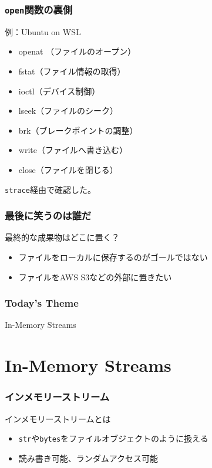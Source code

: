 \documentclass[dvipdfmx,12pt,notheorems]{beamer}
\theoremstyle{definition}
\begin{document}
\begin{frame}[fragile]\frametitle{\texttt{open}関数の裏側}

\begin{exampleblock}{例：Ubuntu on WSL}
\begin{itemize}
\item openat （ファイルのオープン）
\item fstat（ファイル情報の取得）
\item ioctl（デバイス制御）
\item lseek（ファイルのシーク）
\item brk（ブレークポイントの調整）
\item write（ファイルへ書き込む）
\item close（ファイルを閉じる）
\end{itemize}
\end{exampleblock}
\texttt{strace}経由で確認した。

\end{frame}

\begin{frame}\frametitle{最後に笑うのは誰だ}
\begin{block}{最終的な成果物はどこに置く？}
\begin{itemize}
\item ファイルをローカルに保存するのがゴールではない
\item ファイルをAWS S3などの外部に置きたい
\end{itemize}
\end{block}
\end{frame}

\begin{frame}\frametitle{Today's Theme}
\begin{center}
\huge{In-Memory Streams}
\end{center}
\end{frame}

\section{In-Memory Streams}

\begin{frame}\frametitle{インメモリーストリーム}
\begin{block}{インメモリーストリームとは}
\begin{itemize}
\item \texttt{str}や\texttt{bytes}をファイルオブジェクトのように扱える
\item 読み書き可能、ランダムアクセス可能
\end{itemize}
\end{block}
\end{frame}
\end{document}
